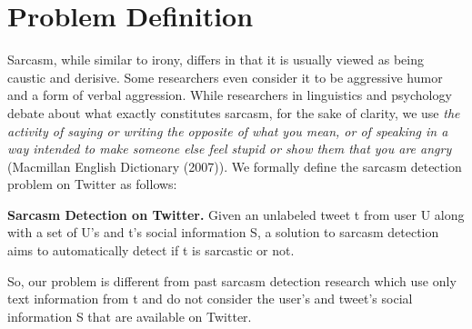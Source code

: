 \section{Problem Definition}
\label{sec:problem}
Sarcasm, while similar to irony, differs in that it is usually viewed as being caustic and derisive. Some researchers even
consider it to be aggressive humor and a form of verbal aggression. While researchers in linguistics and psychology debate about what exactly constitutes sarcasm, for the
sake of clarity, we use \textit{the activity of saying or writing the opposite of what you mean, or of speaking in a way intended to make someone
else feel stupid or show them that you are angry} (Macmillan English Dictionary (2007)). We formally define the sarcasm detection problem on Twitter as follows:
\begin{mydef}
\textbf{Sarcasm Detection on Twitter.} Given an
unlabeled tweet t from user U along with a set of U’s and t's social information S, a solution to sarcasm detection aims to automatically detect if t is sarcastic or not.
\end{mydef}
So, our problem is different from past sarcasm detection research
which use only text information from t and do not consider
the user's and tweet's social information S that are available on Twitter.